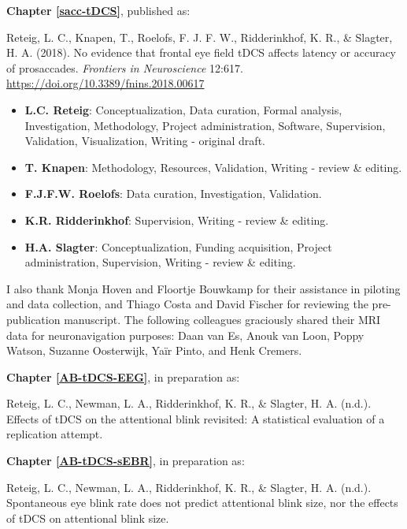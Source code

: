 \documentclass[11pt,]{memoir}
\providecommand{\tightlist}{%
  \setlength{\itemsep}{0pt}\setlength{\parskip}{0pt}}
\begin{document}
\textbf{Chapter \ref{sacc-tDCS}}, published as:

Reteig, L. C., Knapen, T., Roelofs, F. J. F. W., Ridderinkhof, K. R., \& Slagter, H. A. (2018). No evidence that frontal eye field tDCS affects latency or accuracy of prosaccades. \emph{Frontiers in Neuroscience} 12:617. \url{https://doi.org/10.3389/fnins.2018.00617}

\begin{itemize}
\tightlist
\item
  \textbf{L.C. Reteig}: Conceptualization, Data curation, Formal analysis, Investigation, Methodology, Project administration, Software, Supervision, Validation, Visualization, Writing - original draft.
\item
  \textbf{T. Knapen}: Methodology, Resources, Validation, Writing - review \& editing.
\item
  \textbf{F.J.F.W. Roelofs}: Data curation, Investigation, Validation.
\item
  \textbf{K.R. Ridderinkhof}: Supervision, Writing - review \& editing.
\item
  \textbf{H.A. Slagter}: Conceptualization, Funding acquisition, Project administration, Supervision, Writing - review \& editing.
\end{itemize}

\begin{list}{}{\leftmargin=1.5em\rightmargin=0pt}
\item
I also thank Monja Hoven and Floortje Bouwkamp for their assistance in piloting and data collection, and Thiago Costa and David Fischer for reviewing the pre-publication manuscript. The following colleagues graciously shared their MRI data for neuronavigation purposes: Daan van Es, Anouk van Loon, Poppy Watson, Suzanne Oosterwijk, Yaïr Pinto, and Henk Cremers.
\end{list}

\clearpage

\textbf{Chapter \ref{AB-tDCS-EEG}}, in preparation as:

Reteig, L. C., Newman, L. A., Ridderinkhof, K. R., \& Slagter, H. A. (n.d.). Effects of tDCS on the attentional blink revisited: A statistical evaluation of a replication attempt.

\textbf{Chapter \ref{AB-tDCS-sEBR}}, in preparation as:

Reteig, L. C., Newman, L. A., Ridderinkhof, K. R., \& Slagter, H. A. (n.d.). Spontaneous eye blink rate does not predict attentional blink size, nor the effects of tDCS on attentional blink size.
\end{document}
